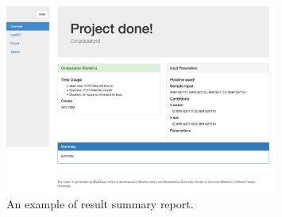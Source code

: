 \begin{figure}[!tb]
\centering
\includegraphics[width=0.8\textwidth]{images/report_home}
\caption[Result summary report]{
    An example of result summary report.
}
\label{fig:report}
\end{figure}
